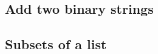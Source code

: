 \documentclass[10pt,a4paper]{article}
\begin{document}
\subsection*{Add two binary strings}

\subsection*{Subsets of a list}

% 
% 
\end{document}
